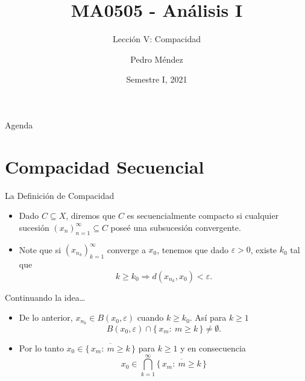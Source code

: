 \documentclass[utf8]{beamer}
\title[MA0505]{MA0505 - An\'alisis I}
\subtitle{Lecci\'on V: Compacidad}
\author{Pedro M\'endez\inst{1}}
\institute[Universidad de Costa Rica] %
{
  \inst{1}%
  Departmento de Matem\'atica Pura y Ciencias Actuariales\\
  Universidad de Costa Rica
  }
\date[I-2021] {Semestre I, 2021}
\theoremstyle{plain}
\theoremstyle{definition}
\theoremstyle{remark}
\numberwithin{equation}{section}
\newcommand{\eps}{\varepsilon}          %
\newcommand{\set}[1]{\{\,#1\,\}}    %
\renewcommand{\geq}{\geqslant}          %
\newcommand{\To}{\Rightarrow}
\newcommand{\ov}{\overline}
\begin{document}
\begin{frame}
  \titlepage
\end{frame}

\begin{frame}{Agenda}
  \tableofcontents
\end{frame}





\section{Compacidad Secuencial}

\begin{frame}{La Definición de Compacidad}%
  \begin{itemize}
  \item Dado $C\subseteq X$, diremos que $C$ es \alert{secuencialmente compacto}\label{def:compacidadSecuencial} si cualquier sucesi\'on $(x_n)_{n=1}^\infty\subseteq C$ pose\'e una subsucesi\'on convergente.
  \item Note que si $(x_{n_k})_{k=1}^\infty$ converge a $x_0$, tenemos que dado $\eps>0$, existe $k_0$ tal que 
  $$k\geq k_0\To d(x_{n_k},x_0)<\eps.$$
  \end{itemize}
\end{frame}

\begin{frame}{Continuando la idea\dots}
\begin{itemize}
  \item De lo anterior, $x_{n_k}\in B(x_0,\eps)$ cuando $k\geq k_0$. As\'i para $k\geq 1$
  $$B(x_0,\eps)\cap\set{x_m:\ m\geq k}\neq \emptyset.$$
  \item Por lo tanto $x_0\in \ov{\set{x_m:\ m\geq k}}$ para $k\geq 1$ y en consecuencia 
  $$x_0\in \bigcap_{k=1}^\infty\ov{\set{x_m:\ m\geq k}}$$
\end{itemize}
\end{frame}
\end{document}
